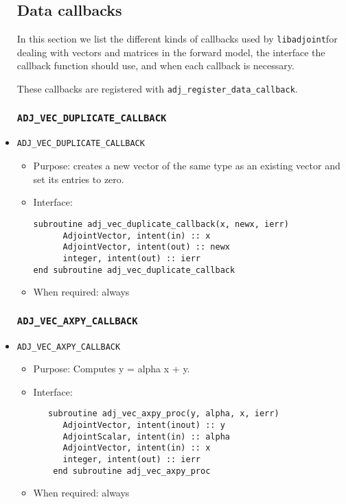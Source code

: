 \documentclass[10pt,authoryear]{elsarticle}
\newcommand{\libadjoint}[0]{{\texttt{libadjoint}}}
\begin{document}
\begin{itemize}
\subsection{Data callbacks} \label{sec:data_callbacks}
In this section we list the different kinds of callbacks used by \libadjoint for dealing with
vectors and matrices in the forward model, the interface
the callback function should use, and when each callback is necessary.

These callbacks are registered with \texttt{adj\_register\_data\_callback}.

\subsubsection{\texttt{ADJ\_VEC\_DUPLICATE\_CALLBACK}}
\item \texttt{ADJ\_VEC\_DUPLICATE\_CALLBACK}
 \begin{itemize}
 \item Purpose: creates a new vector of the same type as an existing vector and set its entries to zero.
 \item Interface:
\begin{verbatim}
subroutine adj_vec_duplicate_callback(x, newx, ierr)
      AdjointVector, intent(in) :: x
      AdjointVector, intent(out) :: newx
      integer, intent(out) :: ierr
end subroutine adj_vec_duplicate_callback
\end{verbatim}
 \item When required: always
 \end{itemize}

\subsubsection{\texttt{ADJ\_VEC\_AXPY\_CALLBACK}}
\item \texttt{ADJ\_VEC\_AXPY\_CALLBACK}
 \begin{itemize}
 \item Purpose: Computes y = alpha x + y.
 \item Interface:
\begin{verbatim}
   subroutine adj_vec_axpy_proc(y, alpha, x, ierr)
      AdjointVector, intent(inout) :: y
      AdjointScalar, intent(in) :: alpha
      AdjointVector, intent(in) :: x
      integer, intent(out) :: ierr
    end subroutine adj_vec_axpy_proc
\end{verbatim}
 \item When required: always
 \end{itemize}


\end{itemize}
\end{document}
